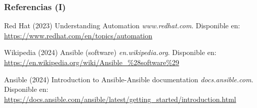 \documentclass[
	11pt, %
]{beamer}
\begin{document}
\begin{frame} %
	\frametitle{Referencias (I)}
	
	\begin{thebibliography}{99} %
		\footnotesize %
		
                Red Hat (2023)
                \newblock Understanding Automation
                \newblock \emph{www.redhat.com}. Disponible en: \url{https://www.redhat.com/en/topics/automation}
   
                Wikipedia (2024)
                \newblock Ansible (software)
                \newblock \emph{en.wikipedia.org}. Disponible en: \url{https://en.wikipedia.org/wiki/Ansible\_\%28software\%29}
            
                Ansible (2024)
                \newblock Introduction to Ansible-Ansible documentation
                \newblock \emph{docs.ansible.com}. Disponible en: \url{https://docs.ansible.com/ansible/latest/getting_started/introduction.html}

	\end{thebibliography}
\end{frame}

\end{document}
